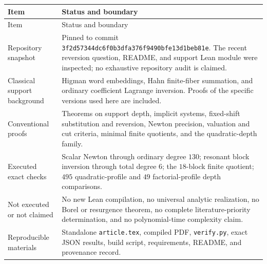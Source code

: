 \documentclass[11pt,a4paper]{article}
\theoremstyle{definition}
\theoremstyle{remark}
\newcommand{\pathcode}[1]{\nolinkurl{#1}}
\begin{document}
\begin{longtable}{@{}p{}p{}@{}}
\toprule
Item & Status and boundary\\
\midrule
\endfirsthead
\toprule
Item & Status and boundary\\
\midrule
\endhead
Repository snapshot & Pinned to commit
\pathcode{3f2d57344dc6f0b3dfa376f9490bfe13d1beb81e}.
The recent reversion question, README, and support Lean module were
inspected; no exhaustive repository audit is claimed.\\[0.5em]
Classical support background & Higman word embeddings, Hahn finite-fiber
summation, and ordinary coefficient Lagrange inversion. Proofs of the
specific versions used here are included.\\[0.5em]
Conventional proofs & Theorems on support depth, implicit systems,
fixed-shift substitution and reversion, Newton precision, valuation and
cut criteria, minimal finite quotients, and the quadratic-depth family.\\[0.5em]
Executed exact checks & Scalar Newton through ordinary degree $130$;
resonant block inversion through total degree $6$; the $18$-block finite
quotient; $495$ quadratic-profile and $49$ factorial-profile depth comparisons.\\[0.5em]
Not executed or not claimed & No new Lean compilation, no universal
analytic realization, no Borel or resurgence theorem, no complete
literature-priority determination, and no polynomial-time complexity
claim.\\[0.5em]
Reproducible materials & Standalone \pathcode{article.tex}, compiled PDF,
\pathcode{verify.py}, exact JSON results, build script, requirements,
README, and provenance record.\\
\bottomrule
\end{longtable}
\end{document}
